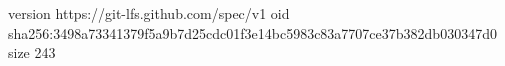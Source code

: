 version https://git-lfs.github.com/spec/v1
oid sha256:3498a73341379f5a9b7d25cdc01f3e14bc5983c83a7707ce37b382db030347d0
size 243
